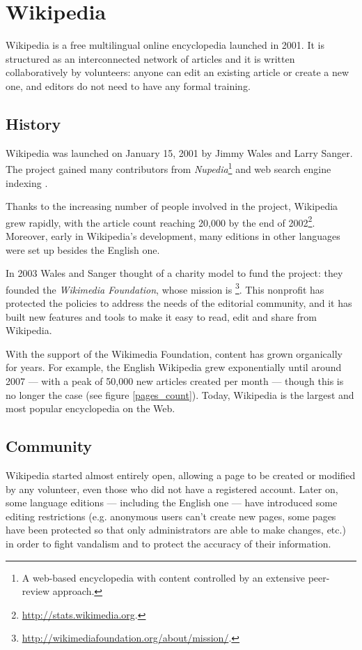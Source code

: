 \chapter{Wikipedia}\label{wikipedia_chapter}
    Wikipedia is a free multilingual online encyclopedia launched in 2001. It is structured as an interconnected network of articles and it is written collaboratively by volunteers: anyone can edit an existing article or create a new one, and editors do not need to have any formal training.
    \section{History}
        Wikipedia was launched on January 15, 2001 by Jimmy Wales and Larry Sanger. The project gained many contributors from \emph{Nupedia}\footnote{A web-based encyclopedia with content controlled by an extensive peer-review approach.} \cite[317]{OpenSources} and web search engine indexing \cite[324]{OpenSources}.
        
        Thanks to the increasing number of people involved in the project, Wikipedia grew rapidly, with the article count reaching 20,000 by the end of 2002\footnote{\url{http://stats.wikimedia.org}.}. Moreover, early in Wikipedia's development, many editions in other languages were set up besides the English one.
        
        In 2003 Wales and Sanger thought of a charity model to fund the project: they founded the \emph{Wikimedia Foundation}, whose mission is \footnote{\url{http://wikimediafoundation.org/about/mission/}.}. This nonprofit has protected the policies to address the needs of the editorial community, and it has built new features and tools to make it easy to read, edit and share from Wikipedia.
        
        With the support of the Wikimedia Foundation, content has grown organically for years. For example, the English Wikipedia grew exponentially until around 2007 --- with a peak of 50,000 new articles created per month --- though this is no longer the case (see figure \ref{pages_count}). Today, Wikipedia is the largest and most popular encyclopedia on the Web.

        
    \section{Community}
        Wikipedia started almost entirely open, allowing a page to be created or modified by any volunteer, even those who did not have a registered account. Later on, some language editions --- including the English one --- have introduced some editing restrictions (e.g. anonymous users can't create new pages, some pages have been protected so that only administrators are able to make changes, etc.) in order to fight vandalism and to protect the accuracy of their information.
        
